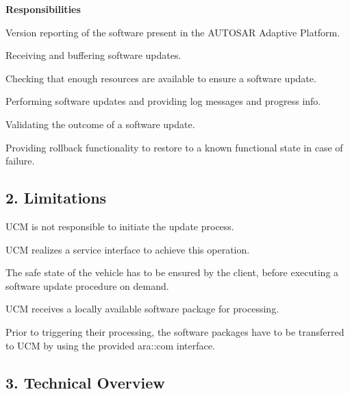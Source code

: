 {\bfseries Responsibilities}
\begin{DoxyItemize}
\item Version reporting of the software present in the A\+U\+T\+O\+S\+AR Adaptive Platform.
\item Receiving and buffering software updates.
\item Checking that enough resources are available to ensure a software update.
\item Performing software updates and providing log messages and progress info.
\item Validating the outcome of a software update.
\item Providing rollback functionality to restore to a known functional state in case of failure. 
\end{DoxyItemize}

\subsection*{2. Limitations}


\begin{DoxyItemize}
\item U\+CM is not responsible to initiate the update process.
\item U\+CM realizes a service interface to achieve this operation.
\item The safe state of the vehicle has to be ensured by the client, before executing a software update procedure on demand.
\item U\+CM receives a locally available software package for processing.
\item Prior to triggering their processing, the software packages have to be transferred to U\+CM by using the provided ara\+::com interface.
\end{DoxyItemize}

\subsection*{3. Technical Overview}

